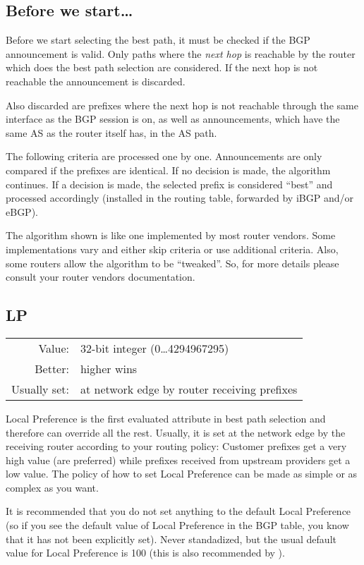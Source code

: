 \subsection{Before we start\ldots}
Before we start selecting the best path, it must be checked if the BGP announcement is valid. Only paths where the \emph{next hop} is reachable by the router which does the best path selection are considered. If the next hop is not reachable the announcement is discarded.

Also discarded are prefixes where the next hop is not reachable through the same interface as the BGP session is on, as well as announcements, which have the same AS as the router itself has, in the AS path.

The following criteria are processed one by one. Announcements are only compared if the prefixes are identical. If no decision is made, the algorithm continues. If a decision is made, the selected prefix is considered ``best'' and processed accordingly (installed in the routing table, forwarded by iBGP and/or eBGP).

The algorithm shown is like one implemented by most router vendors. Some implementations vary and either skip criteria or use additional criteria. Also, some routers allow the algorithm to be ``tweaked''. So, for more details please consult your router vendors documentation.

\subsection{\Gls{LP}}
\begin{tabular}{r p{\linewidth}}
Value: & 32-bit integer (0\ldots4294967295) \\
Better: & higher wins \\
Usually set: & at network edge by router receiving prefixes \\
\end{tabular}

Local Preference is the first evaluated attribute in best path selection and therefore can override all the rest. Usually, it is set at the network edge by the receiving router according to your routing policy: Customer prefixes get a very high value (are preferred) while prefixes received from upstream providers get a low value. The policy of how to set Local Preference can be made as simple or as complex as you want.

It is recommended that you do not set anything to the default Local Preference (so if you see the default value of Local Preference in the BGP table, you know that it has not been explicitly set). Never standadized, but the usual default value for Local Preference is 100 (this is also recommended by ).

